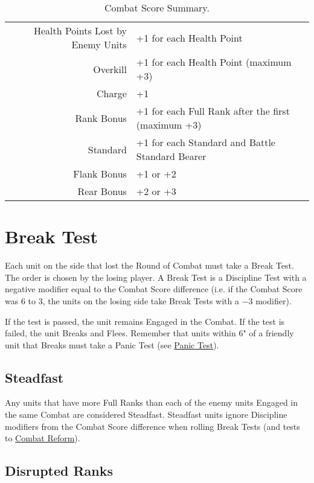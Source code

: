 \begin{table}[H]
\centering
\begin{tabular}{r l }
\toprule
Health Points Lost by Enemy Units & +1 for each Health Point\\
Overkill & +1 for each Health Point (maximum +3)\\
Charge & +1 \\
Rank Bonus & +1 for each Full Rank after the first (maximum +3)\\
Standard & +1 for each Standard and Battle Standard Bearer \\
Flank Bonus & +1 or +2 \\
Rear Bonus & +2 or +3\\
\bottomrule
\end{tabular}
\caption{Combat Score Summary.}
\label{table/combat_score}
\end{table}

\section{Break Test}
\label{break_test}

Each unit on the side that lost the Round of Combat must take a Break Test. The order is chosen by the losing player. A Break Test is a Discipline Test with a negative modifier equal to the Combat Score difference (i.e. if the Combat Score was 6 to 3, the units on the losing side take Break Tests with a −3 modifier). 

If the test is passed, the unit remains Engaged in the Combat. If the test is failed, the unit Breaks and Flees. Remember that units within 6" of a friendly unit that Breaks must take a Panic Test (see \hyperref[panic_test]{Panic Test}).

\subsection{Steadfast}
\label{steadfast}

Any units that have more Full Ranks than each of the enemy units Engaged in the same Combat are considered Steadfast. Steadfast units ignore Discipline modifiers from the Combat Score difference when rolling Break Tests (and tests to \hyperref[combat_reform]{Combat Reform}).

\subsection{Disrupted Ranks}
\label{disrupted_ranks}

